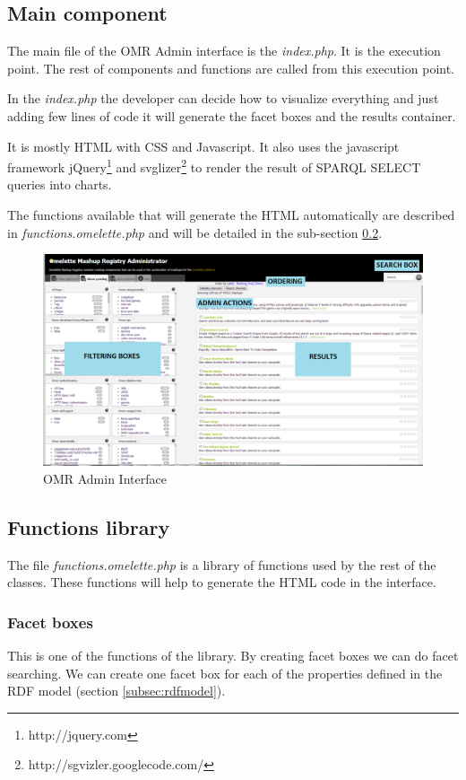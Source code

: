 \FloatBarrier

\subsection{Main component}
The main file of the OMR Admin interface is the \textit{index.php}. It is the execution point. The rest of components and functions are called from this execution point.

In the \textit{index.php} the developer can decide how to visualize everything and just adding few lines of code it will generate the facet boxes and the results container.

It is mostly HTML with CSS and Javascript. It also uses the javascript framework jQuery\footnote{http://jquery.com} and svglizer\footnote{http://sgvizler.googlecode.com/} to render the result of SPARQL SELECT queries into charts.

The functions available that will generate the HTML automatically are described in \textit{functions.omelette.php} and will be detailed in the sub-section \ref{subsec:functionslibrary}.

\begin{figure}[ht!]
	\centering
	\includegraphics[width=400pt]{graphics/omr-admin.png}
	\caption{OMR Admin Interface}
	\label{fig:admininterfacemain}
\end{figure}
\subsection{Functions library}
\label{subsec:functionslibrary}
The file \textit{functions.omelette.php} is a library of functions used by the rest of the classes. These functions will help to generate the HTML code in the interface.

\subsubsection{Facet boxes}
This is one of the functions of the library. By creating facet boxes we can do facet searching. We can create one facet box for each of the properties defined in the RDF model (section \ref{subsec:rdfmodel}).

